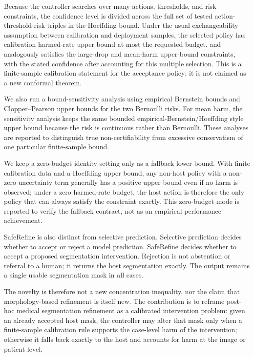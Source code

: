 \documentclass[preprint,12pt]{elsarticle}
\begin{document}
Because the controller searches over many actions, thresholds, and risk
constraints, the confidence level is divided across the full set of tested
action-threshold-risk triples in the Hoeffding bound.
Under the usual exchangeability assumption between calibration and deployment
samples, the selected policy has calibration harmed-rate upper bound at most
the requested budget, and analogously satisfies the large-drop and mean-harm
upper-bound constraints, with the stated confidence after accounting for this
multiple selection. This is a finite-sample calibration statement for the
acceptance policy; it is not claimed as a new conformal theorem.

We also run a bound-sensitivity analysis using empirical Bernstein bounds and
Clopper--Pearson upper bounds for the two Bernoulli risks. For mean harm, the
sensitivity analysis keeps the same bounded empirical-Bernstein/Hoeffding style
upper bound because the risk is continuous rather than Bernoulli. These
analyses are reported to distinguish true non-certifiability from excessive
conservatism of one particular finite-sample bound.

We keep a zero-budget identity setting only as a fallback lower bound. With
finite calibration data and a Hoeffding upper bound, any non-host policy with a
non-zero uncertainty term generally has a positive upper bound even if no harm
is observed; under a zero harmed-rate budget, the host action is therefore the
only policy that can always satisfy the constraint exactly. This zero-budget
mode is reported to verify the fallback contract, not as an empirical performance
achievement.

SafeRefine is also distinct from selective prediction. Selective prediction
decides whether to accept or reject a model prediction. SafeRefine decides
whether to accept a proposed segmentation intervention. Rejection is not
abstention or referral to a human; it returns the host segmentation exactly.
The output remains a single usable segmentation mask in all cases.

The novelty is therefore not a new concentration inequality, nor the claim that
morphology-based refinement is itself new. The contribution is to reframe
post-hoc medical segmentation refinement as a calibrated intervention problem:
given an already accepted host mask, the controller may alter that mask only
when a finite-sample calibration rule supports the case-level harm of the
intervention; otherwise it falls back exactly to the host and accounts for harm
at the image or patient level.
\end{document}
